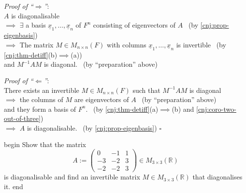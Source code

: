 \documentclass[
  12pt,
  a4paper,
  twoside]{article}
\theoremstyle{plain}
\theoremstyle{definition}
\begin{document}
\emph{Proof of ``\(\Longrightarrow\)''}:\\
\(A\) is diagonalisable\\
\(\implies\) \(\exists\) a basis \(\underline{x}_{1}, \dots, \underline{x}_{n}\) of \(F^n\) consisting of eigenvectors of \(A\) \hfill~{(by \ref{cnj:prop-eigenbasis})}\\
\(\implies\) The matrix \(M\in M_{n\times n}(F)\) with columns \(\underline{x}_{1}, \dots, \underline{x}_{n}\) is invertible \hfill~{(by \ref{cnj:thm-detiff}(b)\(\implies\)(a))}\\
\hspace*{0.333em}\hspace*{0.333em}\hspace*{0.333em}\hspace*{0.333em} and \(M^{-1}AM\) is diagonal. \hfill~{(by ``preparation'' above)}

\emph{Proof of ``\(\Longleftarrow\)''}:\\
There exists an invertible \(M\in M_{n\times n}(F)\) such that \(M^{-1}AM\) is diagonal\\
\(\implies\) the columns of \(M\) are eigenvectors of \(A\) \hfill~{(by ``preparation'' above)}\\
\hspace*{0.333em}\hspace*{0.333em}\hspace*{0.333em}\hspace*{0.333em} and they form a basis of \(F^n\). \hfill~{(by \ref{cnj:thm-detiff}(a)\(\implies\)(b) and \ref{cnj:coro-two-out-of-three})}\\
\(\implies\) \(A\) is diagonalisable. \hfill~{(by \ref{cnj:prop-eigenbasis}) \(\square\)}

\csname begin\label{cnj:expl-diag1}
Show that the matrix
\[
A:= \begin{pmatrix} 0 & -1 & 1 \\ -3 & -2 & 3 \\ -2 & -2 & 3 \end{pmatrix} \in M_{3 \times 3}(\mathbb{R})
\]
is diagonalisable and find an invertible matrix \(M \in M_{3\times 3}(\mathbb{R})\) that diagonalises it.
\csname end
\end{document}
